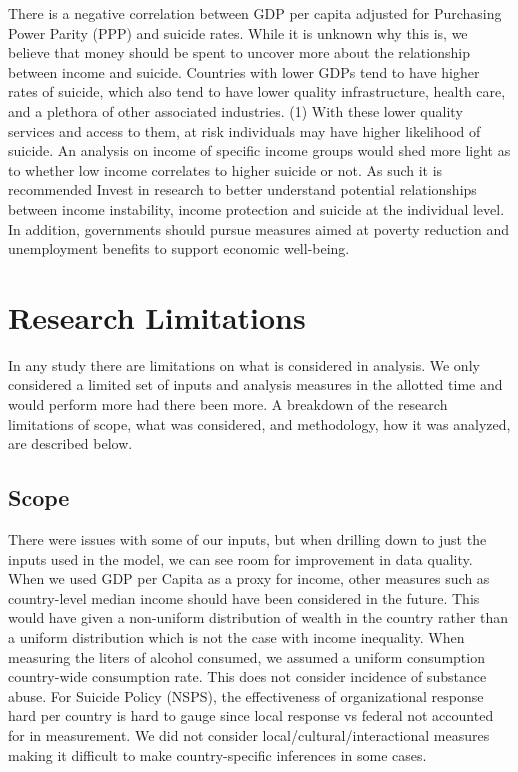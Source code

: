 \documentclass[]{article}
\begin{document}
There is a negative correlation between GDP per capita adjusted for
Purchasing Power Parity (PPP) and suicide rates. While it is unknown why
this is, we believe that money should be spent to uncover more about the
relationship between income and suicide. Countries with lower GDPs tend
to have higher rates of suicide, which also tend to have lower quality
infrastructure, health care, and a plethora of other associated
industries. (1) With these lower quality services and access to them, at
risk individuals may have higher likelihood of suicide. An analysis on
income of specific income groups would shed more light as to whether low
income correlates to higher suicide or not. As such it is recommended
Invest in research to better understand potential relationships between
income instability, income protection and suicide at the individual
level. In addition, governments should pursue measures aimed at poverty
reduction and unemployment benefits to support economic well-being.

\section{Research Limitations}\label{research-limitations}

In any study there are limitations on what is considered in analysis. We
only considered a limited set of inputs and analysis measures in the
allotted time and would perform more had there been more. A breakdown of
the research limitations of scope, what was considered, and methodology,
how it was analyzed, are described below.

\subsection{Scope}\label{scope}

There were issues with some of our inputs, but when drilling down to
just the inputs used in the model, we can see room for improvement in
data quality. When we used GDP per Capita as a proxy for income, other
measures such as country-level median income should have been considered
in the future. This would have given a non-uniform distribution of
wealth in the country rather than a uniform distribution which is not
the case with income inequality. When measuring the liters of alcohol
consumed, we assumed a uniform consumption country-wide consumption
rate. This does not consider incidence of substance abuse. For Suicide
Policy (NSPS), the effectiveness of organizational response hard per
country is hard to gauge since local response vs federal not accounted
for in measurement. We did not consider local/cultural/interactional
measures making it difficult to make country-specific inferences in some
cases.
\end{document}
